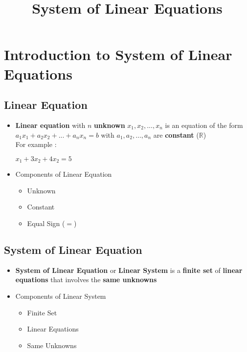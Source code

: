 \documentclass[a4paper,12pt]{article}
\begin{document}
\title{System of Linear Equations}

\section*{Introduction to System of Linear Equations}
\subsection*{Linear Equation}
\begin{itemize}
  \item \textbf{Linear equation} with \(n\) \textbf{unknown} \(x_1, x_2,...,x_n\) is an equation of the form \(a_1x_1 + a_2x_2 + ... + a_nx_n = b\)  with \(a_1, a_2,\dots, a_n\) are \textbf{constant} (\(\mathbb{R}\)) \\ For example :
        \begin{itemize}
          \(x_1+3x_2+4x_2=5\)
        \end{itemize}
  \item Components of Linear Equation
        \begin{itemize}
          \item Unknown
          \item Constant
          \item Equal Sign (\(=\))
        \end{itemize}
\end{itemize}

\subsection*{System of Linear Equation}
\begin{itemize}
  \item \textbf{System of Linear Equation} or \textbf{Linear System} is a \textbf{finite set} of \textbf{linear equations} that involves the \textbf{same unknowns}
  \item Components of Linear System
        \begin{itemize}
          \item Finite Set
          \item Linear Equations
          \item Same Unknowns
        \end{itemize}
\end{itemize}
\end{document}
